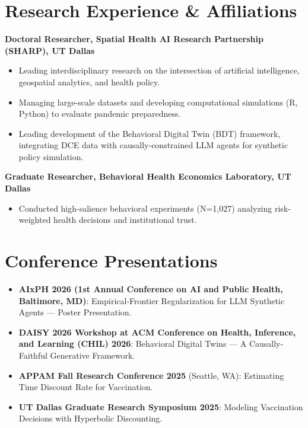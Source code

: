 \documentclass[11pt, letterpaper]{article}
\begin{document}
\section*{Research Experience \& Affiliations}
\textbf{Doctoral Researcher, Spatial Health AI Research Partnership (SHARP), UT Dallas} \\
\begin{itemize}[noitemsep, topsep=0pt, label={-}]
    \item Leading interdisciplinary research on the intersection of artificial intelligence, geospatial analytics, and health policy.
    \item Managing large-scale datasets and developing computational simulations (R, Python) to evaluate pandemic preparedness.
    \item Leading development of the Behavioral Digital Twin (BDT) framework, integrating DCE data with causally-constrained LLM agents for synthetic policy simulation.
\end{itemize}

\vspace{0.5em}
\noindent \textbf{Graduate Researcher, Behavioral Health Economics Laboratory, UT Dallas} \\
\begin{itemize}[noitemsep, topsep=0pt, label={-}]
    \item Conducted high-salience behavioral experiments (N=1,027) analyzing risk-weighted health decisions and institutional trust.
\end{itemize}

\section*{Conference Presentations}
\begin{itemize}[noitemsep, topsep=0pt]
    \item \textbf{AIxPH 2026 (1st Annual Conference on AI and Public Health, Baltimore, MD)}: Empirical-Frontier Regularization for LLM Synthetic Agents — Poster Presentation.
    \item \textbf{DAISY 2026 Workshop at ACM Conference on Health, Inference, and Learning (CHIL) 2026}: Behavioral Digital Twins --- A Causally-Faithful Generative Framework.
    \item \textbf{APPAM Fall Research Conference 2025} (Seattle, WA): Estimating Time Discount Rate for Vaccination.
    \item \textbf{UT Dallas Graduate Research Symposium 2025}: Modeling Vaccination Decisions with Hyperbolic Discounting.
\end{itemize}
\end{document}
